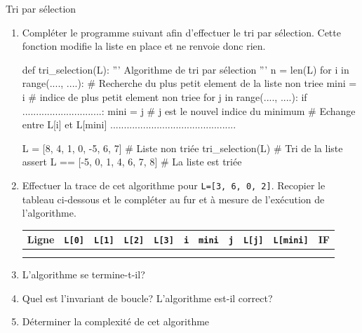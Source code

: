 \begin{exercice_cours}{Tri par sélection}{}
	\begin{enumerate}
		\item 	Compléter le programme suivant afin d'effectuer le tri par sélection. Cette fonction modifie la liste en place et ne renvoie donc rien.


	\begin{CodePythontexAlt}[TaillePolice=\normalsize, Largeur=1\linewidth,Centre,PremLigne=1, Lignes=true,]{}
		def tri_selection(L):
			''' Algorithme de tri par sélection '''
			n = len(L)
			for i in range(...., ....):
				# Recherche du plus petit element de la liste non triee
				mini = i		# indice de plus petit element non triee
				for j in range(...., ....):
					if .............................:
						mini = j 		# j est le nouvel indice du minimum	
				# Echange entre L[i] et L[mini]
				..............................................

		L = [8, 4, 1, 0, -5, 6, 7]				 # Liste non triée
		tri_selection(L)					   # Tri de la liste
		assert L == [-5, 0, 1, 4, 6, 7, 8] 	# La liste est triée
		\end{CodePythontexAlt}


		\item Effectuer la trace de cet algorithme pour \verb+L=[3, 6, 0, 2]+. Recopier le tableau ci-dessous et le compléter au fur et à mesure de l'exécution de l'algorithme.
		
		\begin{center}
			
			\begin{tabular}{|c|c|c|c|c|c|c|c|c|c|c|}
			\hline
				Ligne & \verb+L[0]+ & \verb+L[1]+ & \verb+L[2]+ & \verb+L[3]+ & \verb+i+ & \verb+mini+ & \verb+j+ & \verb+L[j]+ & \verb+L[mini]+ & IF  \\
			\hline
				&&&&&&&&&&\\ \hline
				&&&&&&&&&&\\ \hline

		\end{tabular}
	\end{center}

	\item L'algorithme se termine-t-il? \dotfill{}
	\dotfill{}

	\item Quel est l'invariant de boucle? L'algorithme est-il correct? \dotfill{}
	
	\dotfill{}

	\dotfill{}

	\dotfill{}

	\dotfill{}

	\item Déterminer la complexité de cet algorithme \dotfill{}
	\end{enumerate}

\end{exercice_cours}
